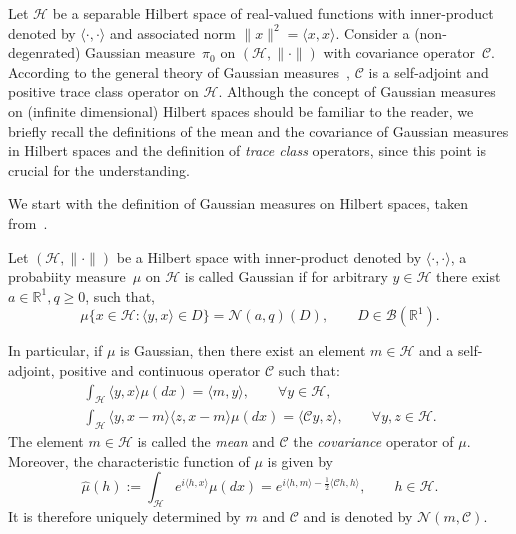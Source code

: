 Let $\mathcal{H}$ be a separable Hilbert space of real-valued functions with inner-product denoted by $\langle \cdot, \cdot \rangle$ and associated norm $\|x\|^2 = \langle x, x \rangle$. Consider a (non-degenrated) Gaussian measure~$\pi_0$ on $(\mathcal{H}, \|\cdot\|)$ with covariance operator~$\mathcal{C}$. According to the general theory of Gaussian measures~\autocite[Chapter I]{DaPrato1992}, $\mathcal{C}$ is a self-adjoint and positive trace class operator on $\mathcal{H}$. Although the concept of Gaussian measures on (infinite dimensional) Hilbert spaces should be familiar to the reader, we briefly recall the definitions of the mean and the covariance of Gaussian measures in Hilbert spaces and the definition of \textit{trace class} operators, since this point is crucial for the understanding.

We start with the definition of Gaussian measures on Hilbert spaces, taken from~\autocite[Section 2.3.2]{DaPrato1992}.

\begin{defin}
\label{DLR-Setting: Definition Gaussian measure}
 Let $(\mathcal{H}, \|\cdot\|)$ be a Hilbert space with inner-product denoted by $\langle \cdot, \cdot \rangle$, a probabiity measure~$\mu$ on $\mathcal{H}$ is called Gaussian if for arbitrary $y \in \mathcal{H}$ there exist $a \in \mathbb{R}^1, q \geq 0$, such that,
 \begin{equation*}
  \mu \{ x \in \mathcal{H}: \langle y, x \rangle \in D \} = \mathcal{N}(a, q) (D), \qquad D \in \mathcal{B}(\mathbb{R}^1).
 \end{equation*}
\end{defin}

 In particular, if $\mu$ is Gaussian, then there exist an element $m \in \mathcal{H}$ and a self-adjoint, positive and continuous operator $\mathcal{C}$ such that:
 \begin{align}
  \int_{\mathcal{H}} \langle y, x \rangle \mu (dx) = \langle m, y \rangle, \qquad \forall y \in \mathcal{H}, \\
  \int_{\mathcal{H}} \langle y, x - m \rangle \langle z, x - m \rangle \mu (dx) = \langle \mathcal{C}y, z \rangle, \qquad \forall y, z \in \mathcal{H}.
 \end{align}
The element $m \in \mathcal{H}$ is called the \textit{mean} and $\mathcal{C}$ the \textit{covariance} operator of $\mu$. Moreover, the characteristic function of $\mu$ is given by 
\begin{equation*}
 \widehat{\mu} (h) := \int_{\mathcal{H}} e^{i \langle h, x \rangle} \mu(dx) = e^{i \langle h, m \rangle - \tfrac{1}{2} \langle \mathcal{C} h, h \rangle}, \qquad h \in \mathcal{H}.
\end{equation*}
It is therefore uniquely determined by $m$ and $\mathcal{C}$ and is denoted by $ \mathcal{N}(m, \mathcal{C})$.

